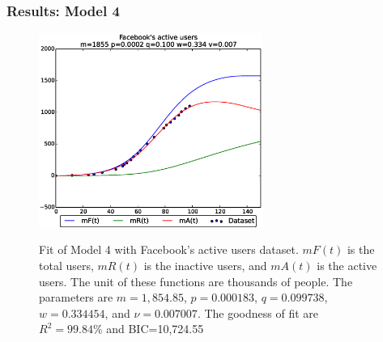 \documentclass{beamer}
\begin{document}
\begin{frame}
\frametitle{Results: Model 4}
\begin{figure}
	\centering
	{\includegraphics*[scale=0.9,width=0.65\textwidth]{images03/fb-model4-1.eps}}
	\caption{Fit of Model 4 with Facebook's active users dataset.\label{fig:model4fit}
		{$mF(t)$ is the total users, $mR(t)$ is the inactive users, and $mA(t)$ is the active users. The unit of these functions are thousands of people. The parameters are $m=1,854.85$, $p=0.000183$, $q=0.099738$, $w=0.334454$, and $\nu=0.007007$. The goodness of fit are $R^2=99.84\%$ and BIC=10,724.55}}
\end{figure}
\end{frame}


\begin{frame}
\titlepage
\end{frame}
\end{document}
